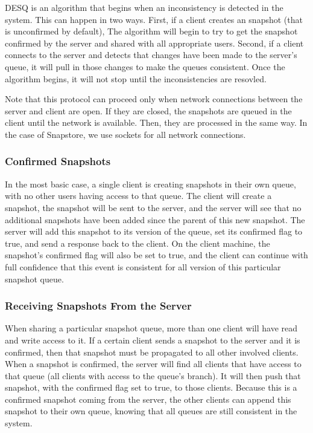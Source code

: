 DESQ is an algorithm that begins when an inconsistency is detected in the system. This can happen in two ways. First, if a client creates an snapshot (that is unconfirmed by default), The algorithm will begin to try to get the snapshot confirmed by the server and shared with all appropriate users. Second, if a client connects to the server and detects that changes have been made to the server's queue, it will pull in those changes to make the queues consistent. Once the algorithm begins, it will not stop until the inconsistencies are resovled. 

Note that this protocol can proceed only when network connections between the server and client are open. If they are closed, the snapshots are queued in the client until the network is available. Then, they are processed in the same way. In the case of Snapstore, we use sockets for all network connections.

\subsubsection{Confirmed Snapshots}

In the most basic case, a single client is creating snapshots in their own queue, with no other users having access to that queue. The client will create a snapshot, the snapshot will be sent to the server, and the server will see that no additional snapshots have been added since the parent of this new snapshot. The server will add this snapshot to its version of the queue, set its confirmed flag to true, and send a response back to the client. On the client machine, the snapshot's confirmed flag will also be set to true, and the client can continue with full confidence that this event is consistent for all version of this particular snapshot queue.

\subsubsection{Receiving Snapshots From the Server}

When sharing a particular snapshot queue, more than one client will have read and write access to it. If a certain client sends a snapshot to the server and it is confirmed, then that snapshot must be propagated to all other involved clients. When a snapshot is confirmed, the server will find all clients that have access to that queue (all clients with access to the queue's branch). It will then push that snapshot, with the confirmed flag set to true, to those clients. Because this is a confirmed snapshot coming from the server, the other clients can append this snapshot to their own queue, knowing that all queues are still consistent in the system.

